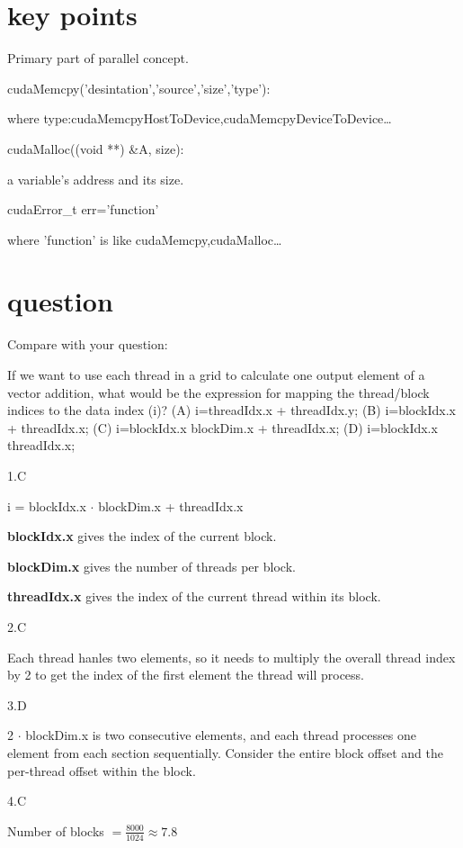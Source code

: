 \documentclass{article}
\begin{document}
\section*{key points}

Primary part of parallel concept.

cudaMemcpy('desintation','source','size','type'):

where type:cudaMemcpyHostToDevice,cudaMemcpyDeviceToDevice\dots

cudaMalloc((void **) \&A, size):

a variable's address and its size.

cudaError\_t err='function'

where 'function' is like cudaMemcpy,cudaMalloc\dots

\section{question}

Compare with your question:

If we want to use each thread in a grid to calculate one output element of a vector addition, what would be the expression for mapping the thread/block indices to the data index (i)? (A) i=threadIdx.x + threadIdx.y; (B) i=blockIdx.x + threadIdx.x; (C) i=blockIdx.x blockDim.x + threadIdx.x; (D) i=blockIdx.x threadIdx.x;

1.C

i = blockIdx.x $\cdot$ blockDim.x + threadIdx.x

\textbf{blockIdx.x} gives the index of the current block.

\textbf{blockDim.x} gives the number of threads per block.

\textbf{threadIdx.x} gives the index of the current thread within its block.


2.C

Each thread hanles two elements, so it needs to multiply the overall thread index by 2 to get the index of the first element the thread will process.



3.D

2 $\cdot$ blockDim.x is two consecutive elements, and each thread processes one element from each section sequentially. Consider the entire block offset and the per-thread offset within the block.


4.C

Number of blocks $= \frac{8000}{1024} \approx 7.8$
\end{document}
